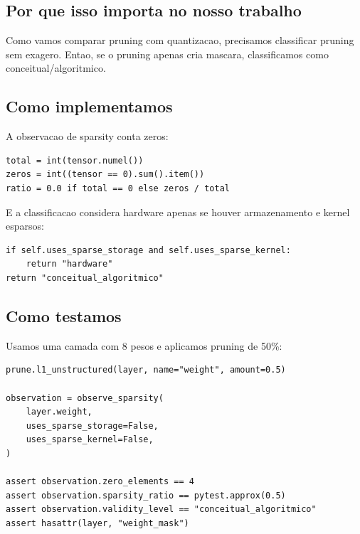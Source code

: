 \subsection{Por que isso importa no nosso trabalho}





Como vamos comparar pruning com quantizacao, precisamos classificar pruning sem exagero. Entao, se o pruning apenas cria mascara, classificamos como conceitual/algoritmico.



\subsection{Como implementamos}



A observacao de sparsity conta zeros:



\begin{Verbatim}[fontsize=\small,breaklines=true,label=python]
total = int(tensor.numel())
zeros = int((tensor == 0).sum().item())
ratio = 0.0 if total == 0 else zeros / total
\end{Verbatim}




E a classificacao considera hardware apenas se houver armazenamento e kernel esparsos:



\begin{Verbatim}[fontsize=\small,breaklines=true,label=python]
if self.uses_sparse_storage and self.uses_sparse_kernel:
    return "hardware"
return "conceitual_algoritmico"
\end{Verbatim}



\subsection{Como testamos}



Usamos uma camada com 8 pesos e aplicamos pruning de 50\%:



\begin{Verbatim}[fontsize=\small,breaklines=true,label=python]
prune.l1_unstructured(layer, name="weight", amount=0.5)

observation = observe_sparsity(
    layer.weight,
    uses_sparse_storage=False,
    uses_sparse_kernel=False,
)

assert observation.zero_elements == 4
assert observation.sparsity_ratio == pytest.approx(0.5)
assert observation.validity_level == "conceitual_algoritmico"
assert hasattr(layer, "weight_mask")
\end{Verbatim}



